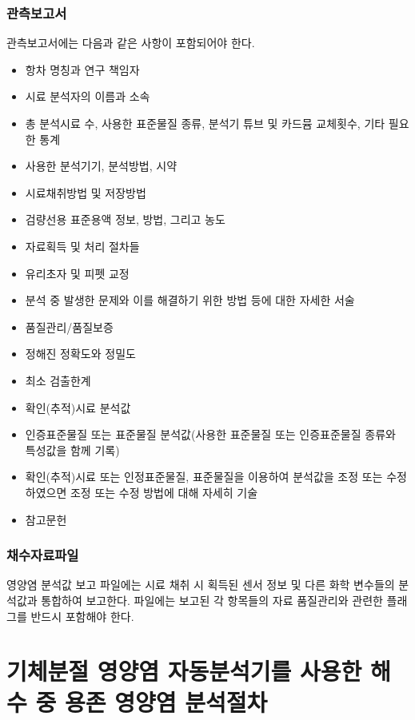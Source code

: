 \documentclass[
]{book}
\providecommand{\tightlist}{%
  \setlength{\itemsep}{0pt}\setlength{\parskip}{0pt}}
\begin{document}
\hypertarget{uxad00uxce21uxbcf4uxace0uxc11c}{%
\subsubsection{관측보고서}\label{uxad00uxce21uxbcf4uxace0uxc11c}}

관측보고서에는 다음과 같은 사항이 포함되어야 한다.

\begin{itemize}
\tightlist
\item
  항차 명칭과 연구 책임자
\item
  시료 분석자의 이름과 소속
\item
  총 분석시료 수, 사용한 표준물질 종류, 분석기 튜브 및 카드뮴 교체횟수, 기타 필요한 통계
\item
  사용한 분석기기, 분석방법, 시약
\item
  시료채취방법 및 저장방법
\item
  검량선용 표준용액 정보, 방법, 그리고 농도
\item
  자료획득 및 처리 절차들
\item
  유리초자 및 피펫 교정
\item
  분석 중 발생한 문제와 이를 해결하기 위한 방법 등에 대한 자세한 서술
\item
  품질관리/품질보증
\item
  정해진 정확도와 정밀도
\item
  최소 검출한계
\item
  확인(추적)시료 분석값
\item
  인증표준물질 또는 표준물질 분석값(사용한 표준물질 또는 인증표준물질 종류와 특성값을 함께 기록)
\item
  확인(추적)시료 또는 인정표준물질, 표준물질을 이용하여 분석값을 조정 또는 수정하였으면 조정 또는 수정 방법에 대해 자세히 기술
\item
  참고문헌
\end{itemize}

\hypertarget{uxcc44uxc218uxc790uxb8ccuxd30cuxc77c}{%
\subsubsection{채수자료파일}\label{uxcc44uxc218uxc790uxb8ccuxd30cuxc77c}}

영양염 분석값 보고 파일에는 시료 채취 시 획득된 센서 정보 및 다른 화학 변수들의 분석값과 통합하여 보고한다. 파일에는 보고된 각 항목들의 자료 품질관리와 관련한 플래그를 반드시 포함해야 한다.

\hypertarget{uxae30uxccb4uxbd84uxc808-uxc601uxc591uxc5fc-uxc790uxb3d9uxbd84uxc11duxae30uxb97c-uxc0acuxc6a9uxd55c-uxd574uxc218-uxc911-uxc6a9uxc874-uxc601uxc591uxc5fc-uxbd84uxc11duxc808uxcc28}{%
\section{기체분절 영양염 자동분석기를 사용한 해수 중 용존 영양염 분석절차}\label{uxae30uxccb4uxbd84uxc808-uxc601uxc591uxc5fc-uxc790uxb3d9uxbd84uxc11duxae30uxb97c-uxc0acuxc6a9uxd55c-uxd574uxc218-uxc911-uxc6a9uxc874-uxc601uxc591uxc5fc-uxbd84uxc11duxc808uxcc28}}
\end{document}
